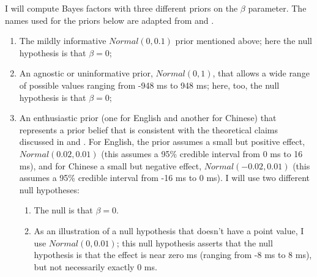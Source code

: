 \documentclass{ar-1col}\usepackage[]{graphicx}\usepackage[]{color}
\begin{document}
I will compute Bayes factors with three different priors on the $\beta$ parameter. The names used for the priors below are adapted from \citet{spiegelhalter1994bayesian} and \citet{Gelman14}.

\begin{enumerate}
\item The mildly informative $\mathit{Normal}(0,0.1)$ prior mentioned above; here the null hypothesis is that $\beta=0$;
\item An agnostic or uninformative prior, $\mathit{Normal}(0,1)$, that allows a wide range of possible values ranging from -948 ms to 948 ms; here, too, the null hypothesis is that $\beta=0$;
\item An enthusiastic prior (one for English and another for Chinese) that represents a prior belief that is consistent with the theoretical claims discussed in \citet{grodner} and \citet{gibsonwu}. For English, the prior assumes a small but positive effect, $\mathit{Normal}(0.02,0.01)$ (this assumes a 95\% credible interval from 0 ms to 16 ms), and for Chinese a small but negative effect, $\mathit{Normal}(-0.02,0.01)$ (this assumes a 95\% credible interval from -16 ms to 0 ms). I will use two different null hypotheses:
\begin{enumerate}
\item  The null is that $\beta = 0$.
\item As an illustration of a null hypothesis that doesn't have a point value, I use $\mathit{Normal}(0,0.01)$; this null hypothesis asserts that the null hypothesis is that the effect is near zero ms (ranging from -8 ms to 8 ms), but not necessarily exactly 0 ms.
\end{enumerate}
\end{enumerate}
\end{document}
